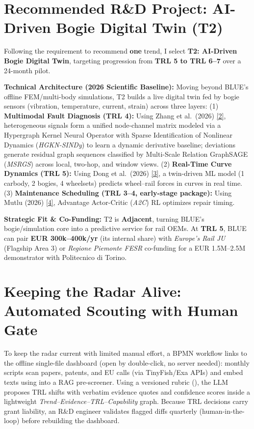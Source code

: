 \documentclass[11pt,a4paper]{article}
\begin{document}
\section{Recommended R\&D Project: AI-Driven Bogie Digital Twin (T2)}
Following the requirement to recommend \textbf{one} trend, I select \textbf{T2: AI-Driven Bogie Digital Twin}, targeting progression from \textbf{TRL 5 to TRL 6--7} over a 24-month pilot.

\textbf{Technical Architecture (2026 Scientific Baseline):} Moving beyond BLUE's offline FEM/multi-body simulations, T2 builds a live digital twin fed by bogie sensors (vibration, temperature, current, strain) across three layers: (1) \textbf{Multimodal Fault Diagnosis (TRL 4):} Using Zhang et al.\ (2026) \href{https://journals.sagepub.com/doi/abs/10.1177/14759217261483593}{[2]}, heterogeneous signals form a unified node-channel matrix modeled via a Hypergraph Kernel Neural Operator with Sparse Identification of Nonlinear Dynamics (\textit{HGKN-SINDy}) to learn a dynamic derivative baseline; deviations generate residual graph sequences classified by Multi-Scale Relation GraphSAGE (\textit{MSRGS}) across local, two-hop, and window views. (2) \textbf{Real-Time Curve Dynamics (TRL 5):} Using Dong et al.\ (2026) \href{https://link.springer.com/article/10.1007/s12206-026-0906-5}{[3]}, a twin-driven ML model (1 carbody, 2 bogies, 4 wheelsets) predicts wheel--rail forces in curves in real time. (3) \textbf{Maintenance Scheduling (TRL 3--4, early-stage package):} Using Mutlu (2026) \href{https://www.mdpi.com/2412-3811/11/3/87}{[4]}, Advantage Actor-Critic (\textit{A2C}) RL optimizes repair timing.

\textbf{Strategic Fit \& Co-Funding:} T2 is \textbf{Adjacent}, turning BLUE's bogie/simulation core into a predictive service for rail OEMs. At \textbf{TRL 5}, BLUE can pair \textbf{EUR 300k--400k/yr} (its internal share) with \textit{Europe's Rail JU} (Flagship Area 3) or \textit{Regione Piemonte FESR} co-funding for a EUR 1.5M--2.5M demonstrator with Politecnico di Torino.

\section{Keeping the Radar Alive: Automated Scouting with Human Gate}
To keep the radar current with limited manual effort, a BPMN workflow links  to the offline single-file dashboard (open  by double-click, no server needed): monthly scripts scan papers, patents, and EU calls (via TinyFish/Exa APIs) and embed texts using  into a RAG pre-screener. Using a versioned rubric (), the LLM proposes TRL shifts with verbatim evidence quotes and confidence scores inside a lightweight \textit{Trend--Evidence--TRL--Capability} graph. Because TRL decisions carry grant liability, an R\&D engineer validates flagged diffs quarterly (human-in-the-loop) before rebuilding the dashboard.
\end{document}
